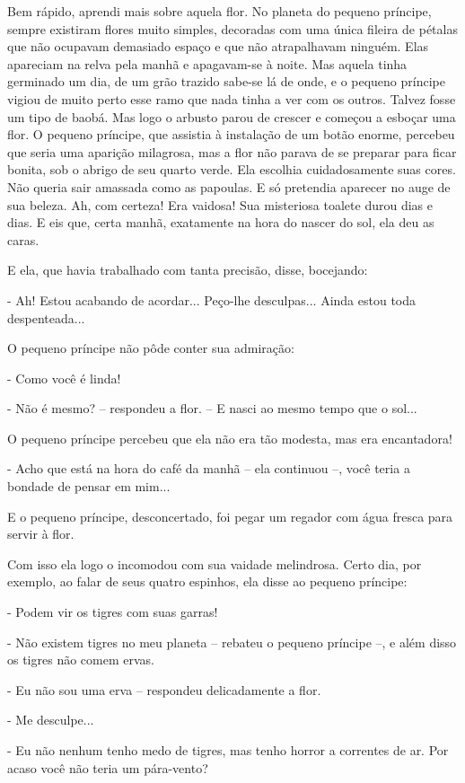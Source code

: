 Bem rápido, aprendi mais sobre aquela flor. No planeta do pequeno
príncipe, sempre existiram flores muito simples, decoradas com uma única
fileira de pétalas que não ocupavam demasiado espaço e que não
atrapalhavam ninguém. Elas apareciam na relva pela manhã e apagavam-se à
noite. Mas aquela tinha germinado um dia, de um grão trazido sabe-se lá
de onde, e o pequeno príncipe vigiou de muito perto esse ramo que nada
tinha a ver com os outros. Talvez fosse um tipo de baobá. Mas logo o
arbusto parou de crescer e começou a esboçar uma flor. O pequeno
príncipe, que assistia à instalação de um botão enorme, percebeu que
seria uma aparição milagrosa, mas a flor não parava de se preparar para
ficar bonita, sob o abrigo de seu quarto verde. Ela escolhia
cuidadosamente suas cores. Não queria sair amassada como as papoulas. E
só pretendia aparecer no auge de sua beleza. Ah, com certeza! Era
vaidosa! Sua misteriosa toalete durou dias e dias. E eis que, certa
manhã, exatamente na hora do nascer do sol, ela deu as caras.

E ela, que havia trabalhado com tanta precisão, disse, bocejando:

- Ah! Estou acabando de acordar... Peço-lhe desculpas... Ainda estou
toda despenteada...

O pequeno príncipe não pôde conter sua admiração:

- Como você é linda!

- Não é mesmo? -- respondeu a flor. -- E nasci ao mesmo tempo que o
sol...

O pequeno príncipe percebeu que ela não era tão modesta, mas era
encantadora!

- Acho que está na hora do café da manhã -- ela continuou --, você teria
a bondade de pensar em mim...

E o pequeno príncipe, desconcertado, foi pegar um regador com água
fresca para servir à flor.

Com isso ela logo o incomodou com sua vaidade melindrosa. Certo dia, por
exemplo, ao falar de seus quatro espinhos, ela disse ao pequeno
príncipe:

- Podem vir os tigres com suas garras!

- Não existem tigres no meu planeta -- rebateu o pequeno príncipe --, e
além disso os tigres não comem ervas.

- Eu não sou uma erva -- respondeu delicadamente a flor.

- Me desculpe...

- Eu não nenhum tenho medo de tigres, mas tenho horror a correntes de
ar. Por acaso você não teria um pára-vento?

